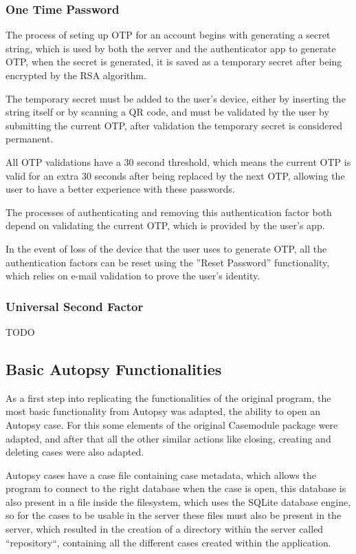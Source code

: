 \pagebreak

\subsubsection*{One Time Password}

The process of seting up OTP for an account begins with generating a secret string, which is used by both the server and the authenticator app to generate OTP, when the secret is generated, it is saved as a temporary secret after being encrypted by the RSA algorithm.

The temporary secret must be added to the user's device, either by inserting the string itself or by scanning a QR code, and must be validated by the user by submitting the current OTP, after validation the temporary secret is considered permanent.

All OTP validations have a 30 second threshold, which means the current OTP is valid for an extra 30 seconds after being replaced by the next OTP, allowing the user to have a better experience with these passwords.

The processes of authenticating and removing this authentication factor both depend on validating the current OTP, which is provided by the user's app.

In the event of loss of the device that the user uses to generate OTP, all the authentication factors can be reset using the ''Reset Password'' functionality, which relies on e-mail validation to prove the user's identity.

\subsubsection*{Universal Second Factor}

TODO

\subsection{Basic Autopsy Functionalities}

As a first step into replicating the functionalities of the original program, the most basic functionality from Autopsy was adapted, the ability to open an Autopsy case. For this some elements of the original Casemodule package were adapted,
and after that all the other similar actions like closing, creating and deleting cases were also adapted.

Autopsy cases have a case file containing case metadata, which allows the program to connect to the right database when the case is open, this database is also present
in a file inside the filesystem, which uses the SQLite database engine, so for the cases to be usable in the server these files must also be present in the server,
which resulted in the creation of a directory within the server called ``repository``, containing all the different cases created within the application.

